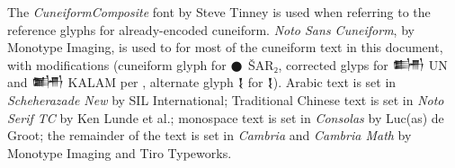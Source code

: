 \documentclass[10pt, a4paper, twoside]{article}
\newcommand\oneEighthIkuC{{\proposalfont\symbol{"12587}}}
\newcommand\oneBurʾuC{{\proposalfont\symbol{"1258E}}}
\newcommand\fiveBurʾuC{{\proposalfont\symbol{"12592}}}
\newcommand\oneBanTwoC{{\proposalfont\symbol{"12593}}}
\newcommand\fiveBanTwoC{{\proposalfont\symbol{"12597}}}
\begin{document}

The \emph{CuneiformComposite} font by Steve Tinney is used when referring to the reference glyphs for already-encoded cuneiform.
\emph{Noto Sans Cuneiform}, by Monotype Imaging,
is used to for most of the cuneiform text in this document, with modifications (cuneiform glyph for {\xsuxfont 𒊹} ŠAR₂,
corrected glyps for {\xsuxfont 𒌦} UN and {\xsuxfont 𒌧} KALAM per \cite{Unicode16},
alternate glyph {\xsuxfont{} 𒋙} for {\xsuxfont 𒋙}).
Arabic text is set in \emph{Scheherazade New} by SIL International;
Traditional Chinese text is set in \emph{Noto Serif TC} by Ken Lunde et al.;
monospace text is set in \emph{Consolas} by Luc(as) de Groot;
the remainder of the text is set in \emph{Cambria} and \emph{Cambria Math} by Monotype Imaging and Tiro Typeworks.
\printbibheading[heading=bibintoc]
\printbibliography[heading=subbibintoc,title={Artefacts},type=artwork]
\printbibliography[heading=subbibintoc,title={ISO and Unicode documents},nottype=artwork,keyword=unicode]
\printbibliography[heading=subbibintoc,title={Online corpora and related projects},nottype=artwork,keyword=reference]
\printbibliography[heading=subbibintoc,title={Other documents},nottype=artwork,notkeyword=unicode,notkeyword=reference]
%
\end{document}
